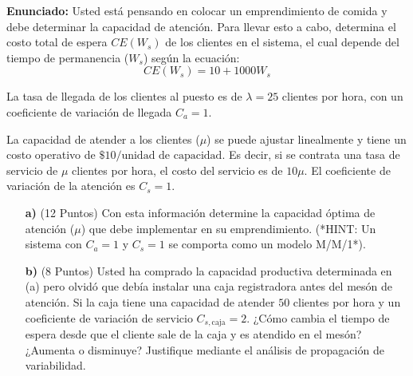 \documentclass[11pt, a4paper]{article}
\begin{document}
  \textbf{Enunciado:}
  Usted está pensando en colocar un emprendimiento de comida y debe determinar la capacidad de atención. Para llevar esto a cabo, determina el costo total de espera $CE(W_s)$ de los clientes en el sistema, el cual depende del tiempo de permanencia ($W_s$) según la ecuación:
  \begin{equation*}
    CE(W_s) = 10 + 1000 W_s
  \end{equation*}

  La tasa de llegada de los clientes al puesto es de $\lambda = 25$ clientes por hora, con un coeficiente de variación de llegada $C_a = 1$. 

  La capacidad de atender a los clientes ($\mu$) se puede ajustar linealmente y tiene un costo operativo de $\$10/\text{unidad de capacidad}$. Es decir, si se contrata una tasa de servicio de $\mu$ clientes por hora, el costo del servicio es de $10\mu$. El coeficiente de variación de la atención es $C_s = 1$.

  \begin{itemize}
    \item[\textbf{a)}] (12 Puntos) Con esta información determine la capacidad óptima de atención ($\mu$) que debe implementar en su emprendimiento. (*HINT: Un sistema con $C_a=1$ y $C_s=1$ se comporta como un modelo M/M/1*).
    \item[\textbf{b)}] (8 Puntos) Usted ha comprado la capacidad productiva determinada en (a) pero olvidó que debía instalar una caja registradora antes del mesón de atención. Si la caja tiene una capacidad de atender $50$ clientes por hora y un coeficiente de variación de servicio $C_{s,\text{caja}} = 2$. ¿Cómo cambia el tiempo de espera desde que el cliente sale de la caja y es atendido en el mesón? ¿Aumenta o disminuye? Justifique mediante el análisis de propagación de variabilidad.
  \end{itemize}
\end{document}
